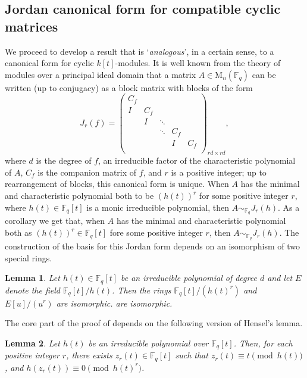 \documentclass[11pt,twoside]{amsart}
\newcommand{\M}{\mathrm{M}}
\newtheorem{lemma}{Lemma}[section]
\theoremstyle{definition} %
\begin{document}
\subsection{Jordan canonical form for compatible cyclic matrices}
We proceed to develop a result that is `\emph{analogous}', in a certain sense, to a canonical form for cyclic $k[t]$-modules. 
It is well known from the theory of modules over a principal ideal domain that a matrix $A \in \M_n(\mathbb F_q)$ can be written (up to conjugacy) as a block matrix with blocks of the form $$J_r(f)=\begin{pmatrix}
C_f &  &   &   &   \\
 I & C_f &  &   &   \\
  &  I & \ddots &  &   \\
  &   & \ddots  & C_f &  \\
  &   &   & I  & C_f \\
\end{pmatrix}_{rd\times rd},$$
where $d$ is the degree of $f$, an irreducible factor of the characteristic polynomial of $A$, $C_f$ is the companion matrix of $f$, and $r$ is a positive integer; up to rearrangement of blocks, this canonical form is unique. 
When $A$ has the minimal and characteristic polynomial both to be $(h(t))^r$ for some positive integer $r$, where $h(t)\in \mathbb{F}_q[t]$ is a monic irreducible polynomial, then $A\sim_{\mathbb{F}_q} J_r(h)$.
As a corollary we get that, when $A$ has the minimal and characteristic polynomial both as $(h(t))^r\in \mathbb{F}_q[t]$ fore some positive integer $r$, then $A\sim_{\mathbb{F}_q} J_r(h)$.
The construction of the basis for this Jordan form depends on an isomorphism of two special rings.
\begin{lemma}\cite[Theorem 2.3.7]{Singla2010}\label{lem:iso-ring-thesis}
    Let $h(t) \in \mathbb{F}_q[t]$ be an irreducible polynomial of degree $d$
and let $E$ denote the field $\mathbb{F}_q[t]/h(t)$. Then the rings $\mathbb{F}_q[t]/(h(t)^r)$ and $E[u]/(u^r)$ are isomorphic.
are isomorphic.
\end{lemma}
The core part of the proof of  depends on the following version of Hensel's lemma.
\begin{lemma}\label{lem:hensel-4}
 Let $h(t)$ be an irreducible polynomial over $\mathbb{F}_q[t]$.
Then, for each positive integer $r$, there exists $z_r(t) \in \mathbb{F}_q[t]$ such that $z_r(t) \equiv
t\pmod{h(t)}$, and $h(z_r(t)) \equiv 0 \pmod{h(t)^r}$.
\end{lemma}
\end{document}
